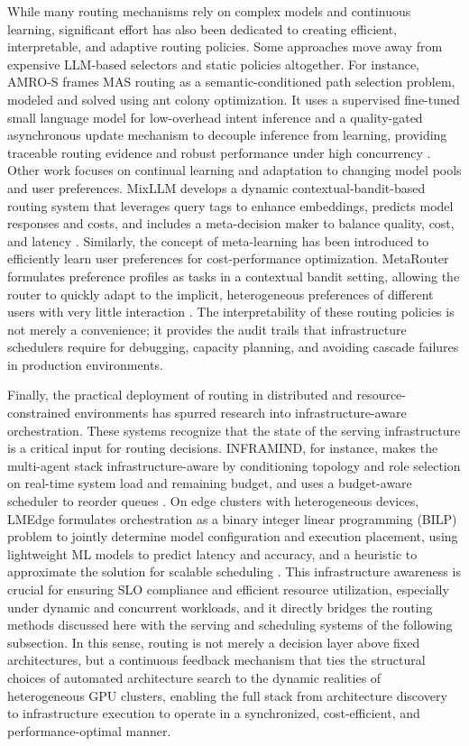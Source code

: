 \documentclass[11pt]{article}
\begin{document}
While many routing mechanisms rely on complex models and continuous learning, significant effort has also been dedicated to creating efficient, interpretable, and adaptive routing policies. Some approaches move away from expensive LLM-based selectors and static policies altogether. For instance, AMRO-S frames MAS routing as a semantic-conditioned path selection problem, modeled and solved using ant colony optimization. It uses a supervised fine-tuned small language model for low-overhead intent inference and a quality-gated asynchronous update mechanism to decouple inference from learning, providing traceable routing evidence and robust performance under high concurrency \cite{ref289}. Other work focuses on continual learning and adaptation to changing model pools and user preferences. MixLLM develops a dynamic contextual-bandit-based routing system that leverages query tags to enhance embeddings, predicts model responses and costs, and includes a meta-decision maker to balance quality, cost, and latency \cite{ref290}. Similarly, the concept of meta-learning has been introduced to efficiently learn user preferences for cost-performance optimization. MetaRouter formulates preference profiles as tasks in a contextual bandit setting, allowing the router to quickly adapt to the implicit, heterogeneous preferences of different users with very little interaction \cite{ref291}. The interpretability of these routing policies is not merely a convenience; it provides the audit trails that infrastructure schedulers require for debugging, capacity planning, and avoiding cascade failures in production environments.

Finally, the practical deployment of routing in distributed and resource-constrained environments has spurred research into infrastructure-aware orchestration. These systems recognize that the state of the serving infrastructure is a critical input for routing decisions. INFRAMIND, for instance, makes the multi-agent stack infrastructure-aware by conditioning topology and role selection on real-time system load and remaining budget, and uses a budget-aware scheduler to reorder queues \cite{ref292}. On edge clusters with heterogeneous devices, LMEdge formulates orchestration as a binary integer linear programming (BILP) problem to jointly determine model configuration and execution placement, using lightweight ML models to predict latency and accuracy, and a heuristic to approximate the solution for scalable scheduling \cite{ref293}. This infrastructure awareness is crucial for ensuring SLO compliance and efficient resource utilization, especially under dynamic and concurrent workloads, and it directly bridges the routing methods discussed here with the serving and scheduling systems of the following subsection. In this sense, routing is not merely a decision layer above fixed architectures, but a continuous feedback mechanism that ties the structural choices of automated architecture search to the dynamic realities of heterogeneous GPU clusters, enabling the full stack from architecture discovery to infrastructure execution to operate in a synchronized, cost-efficient, and performance-optimal manner.
\end{document}
